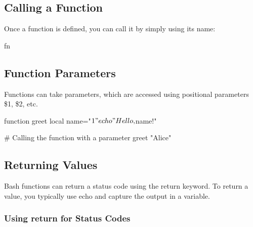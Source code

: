 \documentclass{report}
\begin{document}
    \bigbreak \noindent 
    \subsection{Calling a Function}
    \bigbreak \noindent 
    Once a function is defined, you can call it by simply using its name:
    \bigbreak \noindent 
    \begin{bashcode}
    fn
    \end{bashcode}

    \bigbreak \noindent 
    \subsection{Function Parameters}
    \bigbreak \noindent 
    Functions can take parameters, which are accessed using positional parameters \$1, \$2, etc. 
    \bigbreak \noindent 
    \begin{bashcode}
        function greet {
            local name="$1"
            echo "Hello, $name!"
        }

        # Calling the function with a parameter
        greet "Alice"
    \end{bashcode}
    \bigbreak \noindent 
    \subsection{Returning Values}
    \bigbreak \noindent 
    Bash functions can return a status code using the return keyword. To return a value, you typically use echo and capture the output in a variable.
    \bigbreak \noindent 
    \bigbreak \noindent 
    \subsubsection{Using return for Status Codes}
    \bigbreak \noindent 
\end{document}

